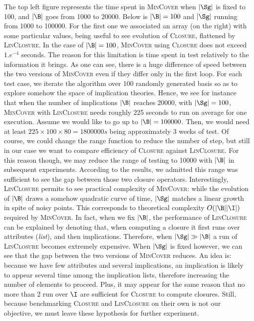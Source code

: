\begin{figure}[H]
	
\end{figure}

\vspace{1.2em}

The top left figure represents the time spent in \textsc{MinCover} when $|\Sg|$ is fixed to 100, and $|\B|$ goes from 1000 to 20000. Below is $|\B| = 100$ and $|\Sg|$ running from 1000 to 100000. For the first one we associated an array (on the right) with some particular values, being useful to see evolution of \textsc{Closure}, flattened by \textsc{LinClosure}. In the case of $|\B| = 100$, \textsc{MinCover} using \textsc{Closure} does not exceed $1.e^{-4}$ seconds. The reason for this limitation is time spent in test relatively to the information it brings. As one can see, there is a huge difference of speed between the two versions of \textsc{MinCover} even if they differ only in the first loop. For each test case, we iterate the algorithm over 100 randomly generated basis so as to explore somehow the space of implication theories. Hence, we see for instance that when the number of implications $|\B|$ reaches 20000, with $|\Sg| = 100$, \textsc{MinCover} with \textsc{LinClosure} needs roughly 225 seconds to run on average for one execution. Assume we would like to go up to $|\B| = 100000$. Then, we would need at least $225 \times 100 \times 80 = 1800000s$ being approximately 3 weeks of test. Of course, we could change the range function to reduce the number of step, but still in our case we want to compare efficiency of \textsc{Closure} against \textsc{LinClosure}. For this reason though, we may reduce the range of testing to 10000 with $|\B|$ in subsequent experiments. According to the results, we admitted this range was sufficient to see the gap between those two closure operators. Interestingly, \textsc{LinClosure} permits to see practical complexity of \textsc{MinCover}: while the evolution of $|\B|$ draws a somehow quadratic curve of time, $|\Sg|$ matches a linear growth in spite of noisy points. This corresponds to theoretical complexity $O(|\B||\I|)$ required by \textsc{MinCover}. In fact, when we fix $|\B|$, the performance of \textsc{LinClosure} can be explained by denoting that, when computing a closure it first runs over attributes (\textit{list}), and then implications. Therefore, when $|\Sg| \gg |\B|$ a run of \textsc{LinClosure} becomes extremely expensive. When $|\Sg|$ is fixed however, we can see that the gap between the two versions of \textsc{MinCover} reduces. An idea is: because we have few attributes and several implications, an implication is likely to appear several time among the implication lists, therefore increasing the number
of elements to proceed. Plus, it may appear for the same reason that no more than 2 run over $\I$ are sufficient for \textsc{Closure} to compute closures. 
Still, because benchmarking \textsc{Closure} and \textsc{LinClosure} on their own is not our objective, we must leave these hypothesis for further experiment.

